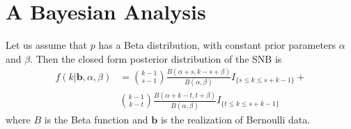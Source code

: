 \documentclass[12pt]{article}         %
\begin{document}


\section{A Bayesian Analysis}



Let us assume that $p$ has a Beta distribution, with constant prior 
parameters $\alpha$ and $\beta$. Then the closed form 
posterior distribution of the SNB is
\begin{align}
f \left(k | \mathbf{b}, \alpha, \beta \right) &= 
  {k-1 \choose s-1} \frac{B\left(\alpha+s, k-s+\beta \right)}{B(\alpha, \beta)} 
  I_{\{s \leq k \leq s+k-1\}} + \nonumber \\
  & {k-1 \choose k-t} 
  \frac{B\left(\alpha + k - t, t+\beta\right)}{B(\alpha, \beta)} 
  I_{\{t \leq k \leq s+k-1\}}
\end{align}
where $B$ is the Beta function and $\mathbf{b}$ is the realization 
of Bernoulli data.
\end{document}
